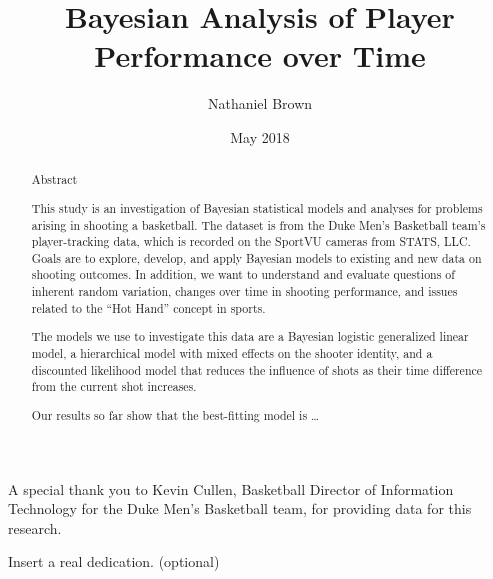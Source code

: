 \documentclass[12pt,twoside]{dukestatscithesis}
\title{Bayesian Analysis of Player Performance over Time}
\author{Nathaniel Brown}
\date{May 2018}
\theoremstyle{definition}
\theoremstyle{definition}
\theoremstyle{definition}
\theoremstyle{remark}
\begin{document}
  \maketitle

\frontmatter %
\pagestyle{empty} %
  \begin{acknowledgements}
    A special thank you to Kevin Cullen, Basketball Director of Information
    Technology for the Duke Men's Basketball team, for providing data for
    this research.
  \end{acknowledgements}

  \hypersetup{linkcolor=black}
  \setcounter{tocdepth}{2}
  \tableofcontents

  \listoftables

  \listoffigures
  \begin{abstract}
    \chapter{Abstract}\label{abstract}
    
    This study is an investigation of Bayesian statistical models and
    analyses for problems arising in shooting a basketball. The dataset is
    from the Duke Men's Basketball team's player-tracking data, which is
    recorded on the SportVU cameras from STATS, LLC. Goals are to explore,
    develop, and apply Bayesian models to existing and new data on shooting
    outcomes. In addition, we want to understand and evaluate questions of
    inherent random variation, changes over time in shooting performance,
    and issues related to the ``Hot Hand'' concept in sports.
    
    The models we use to investigate this data are a Bayesian logistic
    generalized linear model, a hierarchical model with mixed effects on the
    shooter identity, and a discounted likelihood model that reduces the
    influence of shots as their time difference from the current shot
    increases.
    
    Our results so far show that the best-fitting model is \ldots{}
  \end{abstract}
  \begin{dedication}
    Insert a real dedication. (optional)
  \end{dedication}
\mainmatter %
\pagestyle{fancyplain} %
\end{document}
